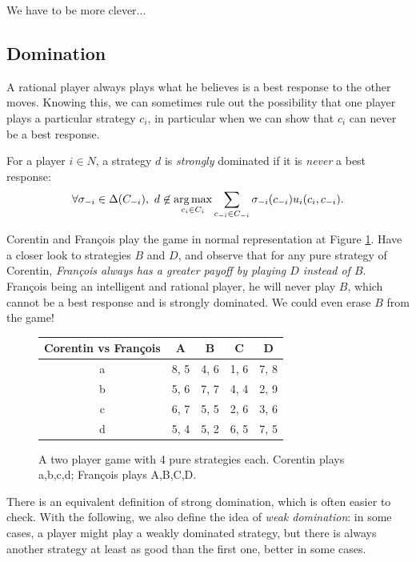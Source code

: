 We have to be more clever...

\subsection{Domination}

A rational player always plays what he believes is a best response to the other moves. Knowing this, we can sometimes rule out the possibility that one player plays a particular strategy $c_i$, in particular when we can show that $c_i$ can never be a best response.

 \begin{definition}
 For a player $i \in N$, a strategy $d$ is \emph{strongly} dominated if it is \emph{never} a best response:
 $$\forall \sigma_{-i} \in \Delta(C_{-i}), \  d \not \in \operatorname*{arg\,max}_{c_i \in C_i} \sum_{c_{-i} \in C_{-i}} \sigma_{-i}(c_{-i}) u_i(c_i, c_{-i}).$$
 \label{chap2:defdomibr}
 \end{definition}

\begin{example}
\label{chap2:exampleintrodomi}
Corentin and Fran\c{c}ois play the game in normal representation at Figure \ref{chap2:videogame}.
Have a closer look to strategies $B$ and $D$, and observe that for any pure strategy of Corentin, \emph{Fran\c{c}ois always has a greater payoff by playing $D$ instead of $B$}.
Fran\c{c}ois being an intelligent and rational player, he will never play $B$, which cannot be a best response and is strongly dominated.
We could even erase $B$ from the game!
 \begin{figure}[!h]
\centering
\begin{tabular}{c|cccc}
  Corentin vs Fran\c{c}ois &  A &  B & C & D\\
\hline a & 8, 5 &  4, 6 & 1, 6 & 7, 8 \\
 b & 5, 6 &  7, 7 & 4, 4 & 2, 9 \\
 c & 6, 7 &  5, 5 & 2, 6 & 3, 6 \\
 d & 5, 4 &  5, 2 & 6, 5 & 7, 5 \\
\end{tabular}
\caption{A two player game with 4 pure strategies each. Corentin plays a,b,c,d; Fran\c{c}ois plays A,B,C,D.}
\label{chap2:videogame}
\end{figure}

\end{example}

There is an equivalent definition of strong domination, which is often easier to check. With the following, we also define the idea of \emph{weak domination}: in some cases, a player might play a weakly dominated strategy, but there is always another strategy at least as good than the first one, better in some cases.


